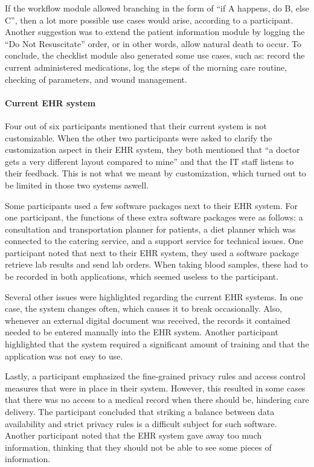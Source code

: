     If the workflow module allowed branching in the form of ``if A happens, do B, else C'', then a lot more possible use cases would arise, according to a participant. Another suggestion was to extend the patient information module by logging the ``Do Not Resuscitate'' order, or in other words, allow natural death to occur. To conclude, the checklist module also generated some use cases, such as: record the current administered medications, log the steps of the morning care routine, checking of parameters, and wound management.

    \paragraph{Current EHR system}

    Four out of six participants mentioned that their current system is not customizable. When the other two participants were asked to clarify the customization aspect in their EHR system, they both mentioned that ``a doctor gets a very different layout compared to mine'' and that the IT staff listens to their feedback. This is not what we meant by customization, which turned out to be limited in those two systems aswell.

    Some participants used a few software packages next to their EHR system. For one participant, the functions of these extra software packages were as follows: a consultation and transportation planner for patients, a diet planner which was connected to the catering service, and a support service for technical issues. One participant noted that next to their EHR system, they used a software package retrieve lab results and send lab orders. When taking blood samples, these had to be recorded in both applications, which seemed useless to the participant.

    Several other issues were highlighted regarding the current EHR systems. In one case, the system changes often, which causes it to break occasionally. Also, whenever an external digital document was received, the records it contained needed to be entered manually into the EHR system. Another participant highlighted that the system required a significant amount of training and that the application was not easy to use.

    Lastly, a participant emphasized the fine-grained privacy rules and access control measures that were in place in their system. However, this resulted in some cases that there was no access to a medical record when there should be, hindering care delivery. The participant concluded that striking a balance between data availability and strict privacy rules is a difficult subject for such software. Another participant noted that the EHR system gave away too much information, thinking that they should not be able to see some pieces of information.

